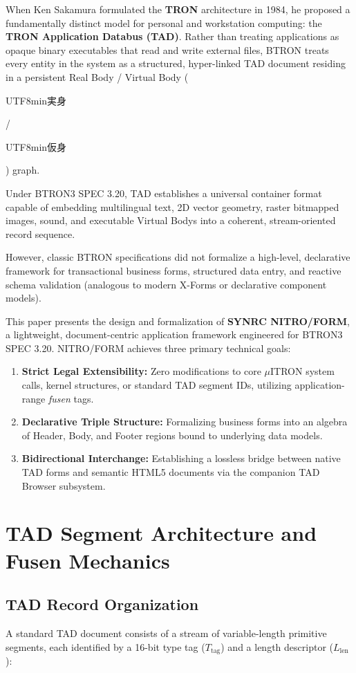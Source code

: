 \documentclass[10pt,journal,compsoc,twocolumn]{article}
\newcommand{\ja}[1]{\begin{CJK*}{UTF8}{min}#1\end{CJK*}}
\begin{document}
When Ken Sakamura formulated the \textbf{TRON} architecture in 1984, he proposed a fundamentally distinct model for personal and workstation computing: the \textbf{TRON Application Databus (TAD)}. Rather than treating applications as opaque binary executables that read and write external files, BTRON treats every entity in the system as a structured, hyper-linked TAD document residing in a persistent Real Body / Virtual Body (\ja{実身}/\ja{仮身}) graph.

Under BTRON3 SPEC 3.20, TAD establishes a universal container format capable of embedding multilingual text, 2D vector geometry, raster bitmapped images, sound, and executable Virtual Bodys into a coherent, stream-oriented record sequence.

However, classic BTRON specifications did not formalize a high-level, declarative framework for transactional business forms, structured data entry, and reactive schema validation (analogous to modern X-Forms or declarative component models).

This paper presents the design and formalization of \textbf{SYNRC NITRO/FORM}, a lightweight, document-centric application framework engineered for BTRON3 SPEC 3.20. NITRO/FORM achieves three primary technical goals:
\begin{enumerate}[leftmargin=*]
    \item \textbf{Strict Legal Extensibility:} Zero modifications to core $\mu$ITRON system calls, kernel structures, or standard TAD segment IDs, utilizing application-range \emph{fusen} tags.
    \item \textbf{Declarative Triple Structure:} Formalizing business forms into an algebra of Header, Body, and Footer regions bound to underlying data models.
    \item \textbf{Bidirectional Interchange:} Establishing a lossless bridge between native TAD forms and semantic HTML5 documents via the companion TAD Browser subsystem.
\end{enumerate}

\section{TAD Segment Architecture and Fusen Mechanics}
\label{sec:tad_foundations}

\subsection{TAD Record Organization}
A standard TAD document consists of a stream of variable-length primitive segments, each identified by a 16-bit type tag ($T_{\text{tag}}$) and a length descriptor ($L_{\text{len}}$):
\end{document}
